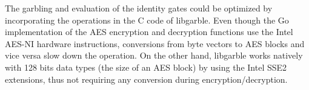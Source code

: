 The garbling and evaluation of the identity gates could be optimized by
incorporating the operations in the C code of libgarble.  Even though the
Go implementation of the AES encryption and decryption functions use the
Intel AES-NI hardware instructions, conversions from byte vectors to AES blocks
and vice versa slow down the operation.  On the other hand, libgarble works
natively with 128 bits data types (the size of an AES block) by using the Intel
SSE2 extensions, thus not requiring any conversion during
encryption/decryption.


